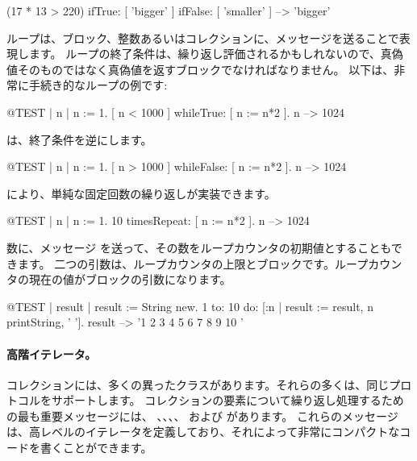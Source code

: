\documentclass[a4paper,10pt,twoside]{book}
\begin{document}
\begin{code}{}
(17 * 13 > 220)
   ifTrue: [ 'bigger' ]
   ifFalse: [ 'smaller' ] --> 'bigger'
\end{code}

ループは、ブロック、整数あるいはコレクションに、メッセージを送ることで表現します。
ループの終了条件は、繰り返し評価されるかもしれないので、真偽値そのものではなく真偽値を返すブロックでなければなりません。
以下は、非常に手続き的なループの例です:

\begin{code}{@TEST | n |}
n := 1.
[ n < 1000 ] whileTrue: [ n := n*2 ].
n --> 1024
\end{code}

\noindent
{} は、終了条件を逆にします。
\begin{code}{@TEST | n |}
n := 1.
[ n > 1000 ] whileFalse: [ n := n*2 ].
n --> 1024
\end{code}

\noindent
{} により、単純な固定回数の繰り返しが実装できます。

\begin{code}{@TEST | n |}
n := 1.
10 timesRepeat: [ n := n*2 ].
n --> 1024
\end{code}

数に、メッセージ  を送って、その数をループカウンタの初期値とすることもできます。
二つの引数は、ループカウンタの上限とブロックです。ループカウンタの現在の値がブロックの引数になります。

\begin{code}{@TEST | result |}
result := String new.
1 to: 10 do: [:n | result := result, n printString, ' '].
result --> '1 2 3 4 5 6 7 8 9 10 '
\end{code}


\paragraph{高階イテレータ。}
コレクションには、多くの異ったクラスがあります。それらの多くは、同じプロトコルをサポートします。
コレクションの要素について繰り返し処理するための最も重要メッセージには、
、、、、 および  があります。
これらのメッセージは、高レベルのイテレータを定義しており、それによって非常にコンパクトなコードを書くことができます。
\end{document}
